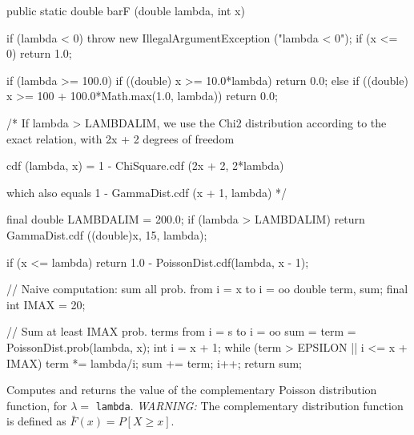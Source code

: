 \begin{code}

   public static double barF (double lambda, int x)\begin{hide} {
      if (lambda < 0)
         throw new IllegalArgumentException ("lambda < 0");
      if (x <= 0)
         return 1.0;

      if (lambda >= 100.0) {
         if ((double) x >= 10.0*lambda)
            return 0.0;
      } else {
         if ((double) x >= 100 + 100.0*Math.max(1.0, lambda))
            return 0.0;
      }

      /* If lambda > LAMBDALIM, we use the Chi2 distribution according to the
         exact relation, with 2x + 2 degrees of freedom

         cdf (lambda, x) = 1 - ChiSquare.cdf (2x + 2, 2*lambda)

         which also equals   1 - GammaDist.cdf (x + 1, lambda) */

      final double LAMBDALIM = 200.0;
      if (lambda > LAMBDALIM)
         return GammaDist.cdf ((double)x, 15, lambda);

      if (x <= lambda)
         return 1.0 - PoissonDist.cdf(lambda, x - 1);

      // Naive computation: sum all prob. from i = x to i = oo
      double term, sum;
      final int IMAX = 20;

      // Sum at least IMAX prob. terms from i = s to i = oo
      sum = term = PoissonDist.prob(lambda, x);
      int i = x + 1;
      while (term > EPSILON || i <= x + IMAX) {
         term *= lambda/i;
         sum += term;
         i++;
      }
      return sum;
   } \end{hide}
\end{code}
  \begin{tabb}  Computes and returns the value of the complementary Poisson
   distribution function, for $\lambda = $ \texttt{lambda}.
   \emph{WARNING:} The complementary distribution function is defined as
    $\bar F(x) = P[X \ge x]$.
 \end{tabb}
